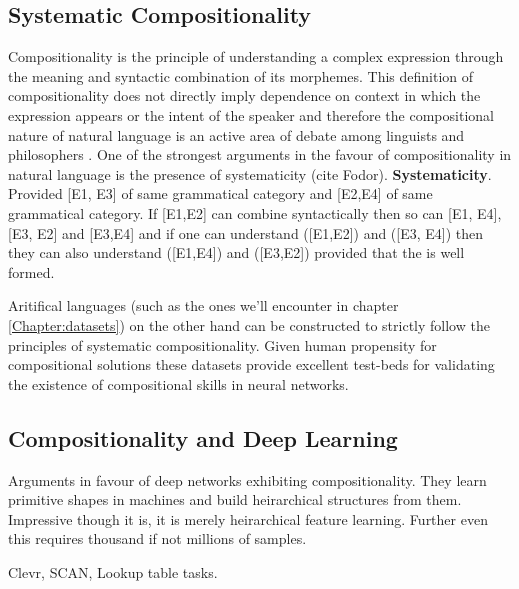 \subsection{Systematic Compositionality} \label{systematic}
Compositionality is the principle of understanding a complex expression through the meaning and syntactic combination of its morphemes. This definition of compositionality does not directly imply dependence on context in which the expression appears or the intent of the speaker and therefore the compositional nature of natural language is an active area of debate among linguists and philosophers \citep{sep-compositionality}. One of the strongest arguments in the favour of compositionality in natural language is the presence of systematicity (cite Fodor). 
%
\textbf{Systematicity}. Provided [E1, E3] of same grammatical category and [E2,E4] of same grammatical category. If [E1,E2] can combine syntactically then so can [E1, E4], [E3, E2] and [E3,E4] and if one can understand ([E1,E2]) and ([E3, E4]) then they can also understand ([E1,E4]) and ([E3,E2]) provided that the is well formed.

Aritifical languages (such as the ones we'll encounter in chapter \ref{Chapter:datasets}) on the other hand can be constructed to strictly follow the principles of systematic compositionality. Given human propensity for compositional solutions \citep{NIPS2016_6130} these datasets provide excellent test-beds for validating the existence of compositional skills in neural networks. 

\subsection{Compositionality and Deep Learning}
Arguments in favour of deep networks exhibiting compositionality. They learn primitive shapes in machines and build heirarchical structures from them. Impressive though it is, it is merely heirarchical feature learning. Further even this requires thousand if not millions of samples.

Clevr, SCAN, Lookup table tasks.

